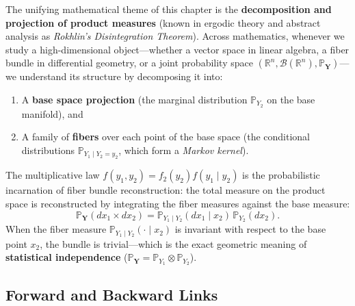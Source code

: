 \documentclass[11pt, letterpaper]{article}
\theoremstyle{definition}
\theoremstyle{remark}
\newcommand{\Prob}{\mathbb{P}}
\begin{document}
The unifying mathematical theme of this chapter is the \textbf{decomposition and projection of product measures} (known in ergodic theory and abstract analysis as \textit{Rokhlin's Disintegration Theorem}). Across mathematics, whenever we study a high-dimensional object—whether a vector space in linear algebra, a fiber bundle in differential geometry, or a joint probability space $(\mathbb{R}^n, \mathcal{B}(\mathbb{R}^n), \Prob_{\mathbf{Y}})$—we understand its structure by decomposing it into:
\begin{enumerate}
    \item A \textbf{base space projection} (the marginal distribution $\Prob_{Y_2}$ on the base manifold), and
    \item A family of \textbf{fibers} over each point of the base space (the conditional distributions $\Prob_{Y_1 \mid Y_2 = y_2}$, which form a \textit{Markov kernel}).
\end{enumerate}
The multiplicative law $f(y_1, y_2) = f_2(y_2) f(y_1 \mid y_2)$ is the probabilistic incarnation of fiber bundle reconstruction: the total measure on the product space is reconstructed by integrating the fiber measures against the base measure:
\[ \Prob_{\mathbf{Y}}(dx_1 \times dx_2) = \Prob_{Y_1 \mid Y_2}(dx_1 \mid x_2) \, \Prob_{Y_2}(dx_2). \]
When the fiber measure $\Prob_{Y_1 \mid Y_2}(\cdot \mid x_2)$ is invariant with respect to the base point $x_2$, the bundle is trivial—which is the exact geometric meaning of \textbf{statistical independence} ($\Prob_{\mathbf{Y}} = \Prob_{Y_1} \otimes \Prob_{Y_2}$).

\subsection{Forward and Backward Links}
\end{document}
